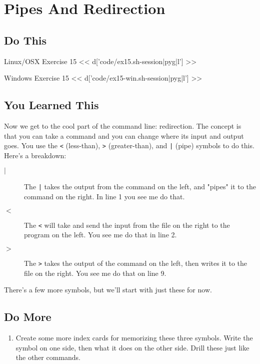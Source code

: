 \chapter{Pipes And Redirection}

\section{Do This}

\begin{code}{Linux/OSX Exercise 15}
<< d['code/ex15.sh-session|pyg|l'] >>
\end{code}

\begin{code}{Windows Exercise 15}
<< d['code/ex15-win.sh-session|pyg|l'] >>
\end{code}

\section{You Learned This}

Now we get to the cool part of the command line: redirection.  The concept is
that you can take a command and you can change where its input and output goes. 
You use the \verb|<| (less-than), \verb|>| (greater-than), and \verb,|, (pipe) 
symbols to do this.  Here's a breakdown:

\begin{description}
\item[$|$] The \verb,|, takes the output from the command on the left, and "pipes" it to the command on the right.  In line 1 you see me do that.
\item[$<$] The \verb|<| will take and send the input from the file on the right to the program on the left.  You see me do that in line 2.
\item[$>$] The \verb|>| takes the output of the command on the left, then writes it
    to the file on the right.  You see me do that on line 9.
\end{description}

There's a few more symbols, but we'll start with just these for now.

\section{Do More}

\begin{enumerate}
\item Create some more index cards for memorizing these three symbols.  Write the symbol on one side, then what it does on the other side.  Drill these just like the other commands.
\end{enumerate}

